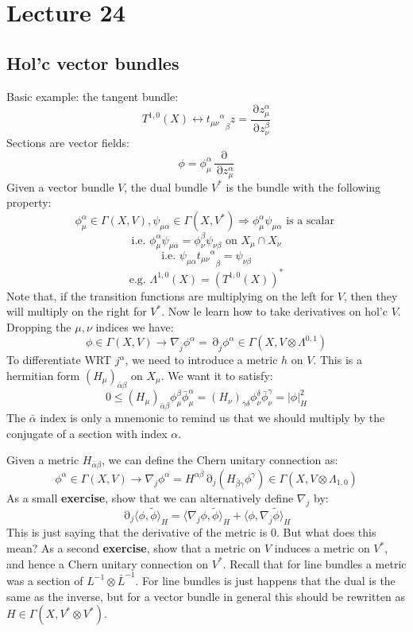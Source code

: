 \documentclass[12 pt]{article}
\DeclareMathOperator {\p} {\partial}
\theoremstyle{plain}
\theoremstyle{definition}
\theoremstyle{remark}
\begin{document}
\section*{Lecture 24}
\subsection*{Hol'c vector bundles}
Basic example: the tangent bundle:
\[     T^{1,0} (X)  \longleftrightarrow {{t_{\mu\nu}}^{\alpha}}_{\beta} z = \frac{\p z_{\mu}^{\alpha}}{\p z_{\nu}^{\beta}}     \]
Sections are vector fields:
\[      \phi = \phi_{\mu}^{\alpha} \frac{\p}{\p z_{\mu}^{\alpha}}    \]
Given a vector bundle $V$, the dual bundle $V^*$ is the bundle with the following property:
\[     \phi^{\alpha}_{\mu} \in \Gamma(X,V)  , \psi_{\mu \alpha} \in \Gamma(X,V^*) \Rightarrow \phi_{\mu}^{\alpha} \psi_{\mu \alpha} \text{ is a scalar }   \]
\[      \text{i.e. }   \phi_{\mu}^{\alpha} \psi_{\mu \alpha} = \phi_{\nu}^{\beta} \psi_{\nu \beta} \text{ on } X_{\mu} \cap X_{\nu}  \]
\[          \text{i.e. } \psi_{\mu \alpha} {{t_{\mu\nu}}^{\alpha}}_{\beta} = \psi_{\nu \beta}          \]
\[     \text{e.g. } \Lambda^{1,0} (X) = (T^{1,0}(X))^*         \]
Note that, if the transition functions are multiplying on the left for $V$, then they will multiply on the right for $V^*$. Now le learn how to take derivatives on hol'c $V$. Dropping the $\mu,\nu$ indices we have:
\[      \phi \in \Gamma(X,V)  \longrightarrow \nabla_{\bar j} \phi^{\alpha} = \p_{\bar j} \phi^{\alpha} \in \Gamma(X, V \otimes \Lambda^{0,1})     \]
To differentiate WRT $j^{\alpha}$, we need to introduce a metric $h$ on $V$. This is a hermitian form $(H_{\mu})_{\bar \alpha \beta}$ on $X_{\mu}$. We want it to satisfy:
\[      0 \leq  (H_{\mu})_{\bar \alpha \beta} \phi_{\mu}^{\beta} \bar \phi_{\mu}^{\alpha} =  (H_{\nu})_{\bar \gamma \delta} \phi_{\nu}^{\delta} \bar \phi_{\nu}^{\gamma}  =  |\phi|^2_H  \]
The $\bar \alpha$ index is only a mnemonic to remind us that we should multiply by the conjugate of a section with index $\alpha$.

Given a metric $H_{\bar \alpha \beta}$, we can define the Chern unitary connection as:
\[ \phi^{\alpha} \in \Gamma(X,V) \longrightarrow   \nabla_j \phi^{\alpha} = H^{\alpha \bar \beta} \p_{j} (H_{\bar \beta \gamma} \phi^{\gamma})    \in \Gamma(X, V\otimes \Lambda_{1,0})    \]
As a small \textbf{exercise}, show that we can alternatively define $\nabla_j$ by:
\[      \p_j \langle \phi, \tilde \phi \rangle_H = \langle \nabla_j \phi, \tilde \phi \rangle_H + \langle \phi, \nabla_{\bar j} \tilde \phi \rangle_H     \]
This is just saying that the derivative of the metric is 0. But what does this mean? As a second \textbf{exercise}, show that a metric on $V$ induces a metric on $V^*$, and hence a Chern unitary connection on $V^*$. Recall that for line bundles a metric was a section of $L^{-1} \otimes \bar L^{-1}$. For line bundles is just happens that the dual is the same as the inverse, but for a vector bundle in general this should be rewritten as $H \in \Gamma(X, V^* \otimes V^*)$.
\end{document}
